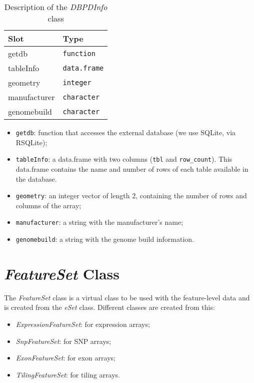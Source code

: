\documentclass{article}
\newcommand{\Robject}[1]{{\texttt{#1}}}
\newcommand{\Rclass}[1]{{\textit{#1}}}
\begin{document}
\begin{table}[h]
  \centering
  \begin{tabular}{|l|l|}
    \hline
    Slot & Type \\ \hline
    getdb & \Robject{function} \\
    tableInfo & \Robject{data.frame} \\
    geometry & \Robject{integer} \\
    manufacturer & \Robject{character} \\
    genomebuild & \Robject{character} \\ \hline
  \end{tabular}
  \label{DBPDInfo}
  \caption{Description of the \Rclass{DBPDInfo} class}
\end{table}

\begin{itemize}
\item \Robject{getdb}: function that accesses the external database (we use SQLite, via RSQLite);
\item \Robject{tableInfo}: a data.frame with two columns (\Robject{tbl}
  and \Robject{row\_count}). This data.frame contains the name and number
  of rows of each table available in the database.
\item \Robject{geometry}: an integer vector of length 2, containing the
  number of rows and columns of the array;
\item \Robject{manufacturer}: a string with the manufacturer's name;
\item \Robject{genomebuild}: a string with the genome build information.
\end{itemize}

\section{\Rclass{FeatureSet} Class}

The \Rclass{FeatureSet} class is a virtual class to be used with the
feature-level data and is created from the \Rclass{eSet}
class. Different classes are created from this:
\begin{itemize}
\item \Rclass{ExpressionFeatureSet}: for expression arrays;
\item \Rclass{SnpFeatureSet}: for SNP arrays;
\item \Rclass{ExonFeatureSet}: for exon arrays;
\item \Rclass{TilingFeatureSet}: for tiling arrays.
\end{itemize}
\end{document}
